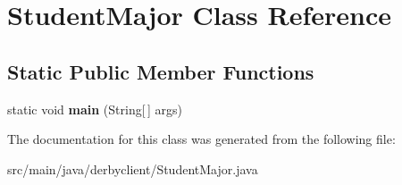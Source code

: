 \hypertarget{classStudentMajor}{}\section{Student\+Major Class Reference}
\label{classStudentMajor}
\subsection*{Static Public Member Functions}
\begin{DoxyCompactItemize}
\item 
\mbox{\label{classStudentMajor_a342e135a491bc559fb77b854fdb29a30}} 
static void {\bfseries main} (String\mbox{[}$\,$\mbox{]} args)
\end{DoxyCompactItemize}


The documentation for this class was generated from the following file\+:\begin{DoxyCompactItemize}
\item 
src/main/java/derbyclient/Student\+Major.\+java\end{DoxyCompactItemize}
